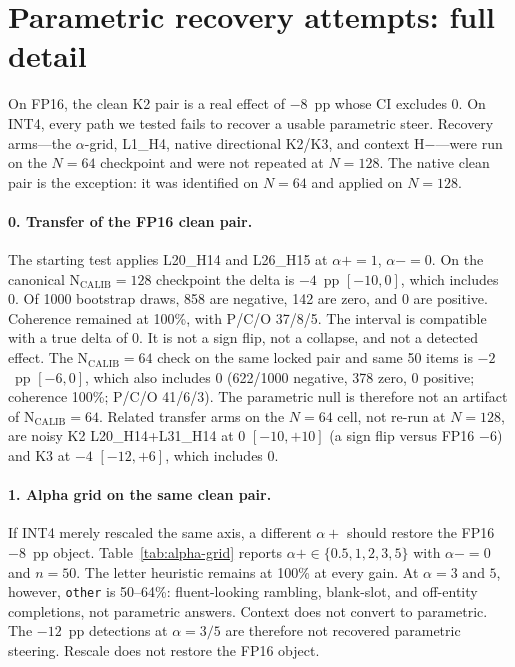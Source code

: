 \documentclass{article} %
\begin{document}
\section{Parametric recovery attempts: full detail}
\label{app:parametric}

On FP16, the clean K2 pair is a real effect of $-8$~pp whose CI excludes 0. On INT4, every path we tested fails to recover a usable parametric steer. Recovery arms---the $\alpha$-grid, L1\_H4, native directional K2/K3, and context H$-$---were run on the $N{=}64$ checkpoint and were not repeated at $N{=}128$. The native clean pair is the exception: it was identified on $N{=}64$ and applied on $N{=}128$.

\paragraph{0. Transfer of the FP16 clean pair.}
The starting test applies L20\_H14 and L26\_H15 at $\alpha{+}{=}1$, $\alpha{-}{=}0$. On the canonical $\mathrm{N_{CALIB}{=}128}$ checkpoint the delta is $-4$~pp $[-10, 0]$, which includes 0. Of 1000 bootstrap draws, 858 are negative, 142 are zero, and 0 are positive. Coherence remained at 100\%, with P/C/O 37/8/5. The interval is compatible with a true delta of 0. It is not a sign flip, not a collapse, and not a detected effect. The $\mathrm{N_{CALIB}{=}64}$ check on the same locked pair and same 50 items is $-2$~pp $[-6, 0]$, which also includes 0 (622/1000 negative, 378 zero, 0 positive; coherence 100\%; P/C/O 41/6/3). The parametric null is therefore not an artifact of $\mathrm{N_{CALIB}{=}64}$. Related transfer arms on the $N{=}64$ cell, not re-run at $N{=}128$, are noisy K2 L20\_H14+L31\_H14 at $0$ $[-10, +10]$ (a sign flip versus FP16 $-6$) and K3 at $-4$ $[-12, +6]$, which includes 0.

\paragraph{1. Alpha grid on the same clean pair.}
If INT4 merely rescaled the same axis, a different $\alpha{+}$ should restore the FP16 $-8$~pp object. Table~\ref{tab:alpha-grid} reports $\alpha{+} \in \{0.5, 1, 2, 3, 5\}$ with $\alpha{-}{=}0$ and $n{=}50$. The letter heuristic remains at 100\% at every gain. At $\alpha{=}3$ and $5$, however, \texttt{other} is 50--64\%: fluent-looking rambling, blank-slot, and off-entity completions, not parametric answers. Context does not convert to parametric. The $-12$~pp detections at $\alpha{=}3/5$ are therefore not recovered parametric steering. Rescale does not restore the FP16 object.
\end{document}
